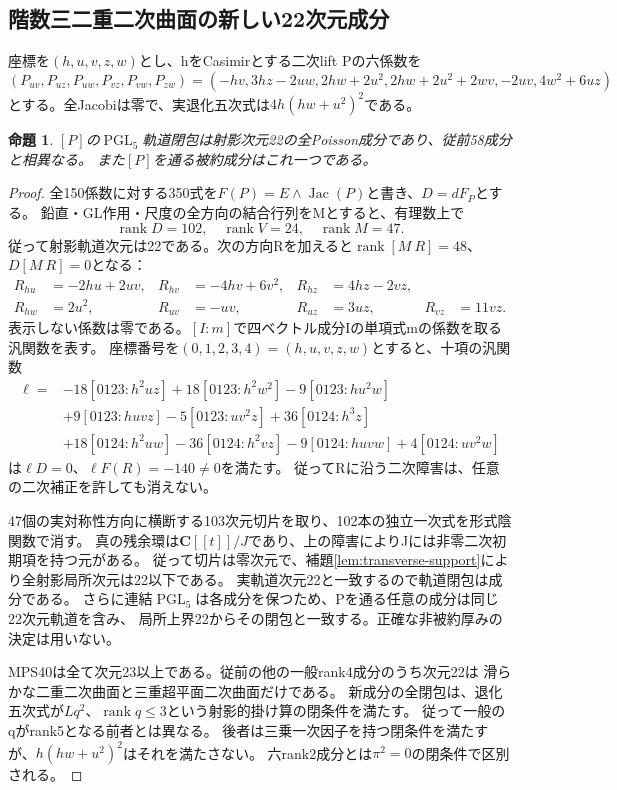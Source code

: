 \documentclass[a4paper,11pt]{ltjsarticle}
\newtheorem{proposition}{命題}[section]
\theoremstyle{definition}
\newcommand{\CC}{\mathbf C}
\newcommand{\rank}{\operatorname{rank}}
\newcommand{\PGL}{\operatorname{PGL}}
\begin{document}
\subsection{階数三二重二次曲面の新しい22次元成分}
座標を$(h,u,v,z,w)$とし、hをCasimirとする二次lift Pの六係数を
\[
 (P_{uv},P_{uz},P_{uw},P_{vz},P_{vw},P_{zw})
 =(-hv,3hz-2uw,2hw+2u^2,2hw+2u^2+2wv,-2uv,4w^2+6uz)
\]
とする。全Jacobiは零で、実退化五次式は$4h(hw+u^2)^2$である。
\begin{proposition}\label{prop:new22}
$[P]$の$\PGL_5$軌道閉包は射影次元22の全Poisson成分であり、従前58成分と相異なる。
また$[P]$を通る被約成分はこれ一つである。
\end{proposition}
\begin{proof}
全150係数に対する350式を$F(P)=E\wedge\operatorname{Jac}(P)$と書き、$D=dF_P$とする。
鉛直・GL作用・尺度の全方向の結合行列をMとすると、有理数上で
\[
 \rank D=102,\quad\rank V=24,\quad\rank M=47.
\]
従って射影軌道次元は22である。次の方向Rを加えると$\rank[M\ R]=48$、$D[M\ R]=0$となる：
\[
\begin{aligned}
R_{hu}&=-2hu+2uv,&R_{hv}&=-4hv+6v^2,&R_{hz}&=4hz-2vz,\\
R_{hw}&=2u^2,&R_{uv}&=-uv,&R_{uz}&=3uz,&R_{vz}&=11vz.
\end{aligned}
\]
表示しない係数は零である。$[I:m]$で四ベクトル成分Iの単項式mの係数を取る汎関数を表す。
座標番号を$(0,1,2,3,4)=(h,u,v,z,w)$とすると、十項の汎関数
\[
\begin{aligned}
\ell={}&-18[0123:h^2uz]+18[0123:h^2w^2]-9[0123:hu^2w]\\
 &+9[0123:huvz]-5[0123:uv^2z]+36[0124:h^3z]\\
 &+18[0124:h^2uw]-36[0124:h^2vz]-9[0124:huvw]+4[0124:uv^2w]
\end{aligned}
\]
は$\ell D=0$、$\ell F(R)=-140\ne0$を満たす。
従ってRに沿う二次障害は、任意の二次補正を許しても消えない。

47個の実対称性方向に横断する103次元切片を取り、102本の独立一次式を形式陰関数で消す。
真の残余環は$\CC[[t]]/J$であり、上の障害によりJには非零二次初期項を持つ元がある。
従って切片は零次元で、補題\ref{lem:transverse-support}により全射影局所次元は22以下である。
実軌道次元22と一致するので軌道閉包は成分である。
さらに連結$\PGL_5$は各成分を保つため、Pを通る任意の成分は同じ22次元軌道を含み、
局所上界22からその閉包と一致する。正確な非被約厚みの決定は用いない。

MPS40は全て次元23以上である。従前の他の一般rank4成分のうち次元22は
滑らかな二重二次曲面と三重超平面二次曲面だけである。
新成分の全閉包は、退化五次式が$Lq^2$、$\rank q\le3$という射影的掛け算の閉条件を満たす。
従って一般のqがrank5となる前者とは異なる。
後者は三乗一次因子を持つ閉条件を満たすが、$h(hw+u^2)^2$はそれを満たさない。
六rank2成分とは$\pi^2=0$の閉条件で区別される。
\end{proof}
\end{document}
